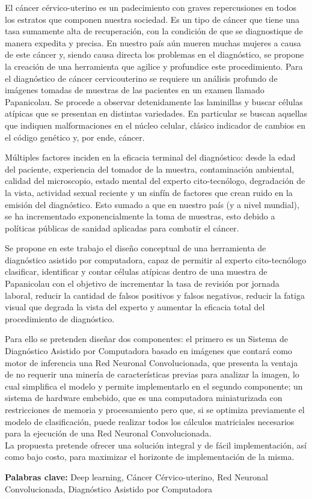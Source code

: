 El cáncer cérvico-uterino es un padecimiento con graves repercusiones en todos
los estratos que componen nuestra sociedad. Es un tipo de cáncer que tiene una tasa
sumamente alta de recuperación, con la condición de que se diagnostique de
manera expedita y precisa. En nuestro país aún mueren muchas mujeres a causa de
este cáncer y, siendo causa directa los problemas en el diagnóstico, se propone
la creación de una herramienta que agilice y profundice este procedimiento. Para
el diagnóstico de cáncer cervicouterino se requiere un análisis profundo de
imágenes tomadas de muestras de las pacientes en un examen llamado Papanicolau.
Se procede a observar detenidamente las laminillas y buscar células atípicas que
se presentan en distintas variedades. En particular se buscan aquellas que
indiquen malformaciones en el núcleo celular, clásico indicador de cambios en el
código genético y, por ende, cáncer. 

Múltiples factores inciden en la eficacia terminal del diagnóstico: desde la
edad del paciente, experiencia del tomador de la muestra, contaminación
ambiental, calidad del microscopio, estado mental del experto cito-tecnólogo,
degradación de la vista, actividad sexual reciente y un sinfín de factores que
crean ruido en la emisión del diagnóstico. Esto sumado a que en nuestro país (y a
nivel mundial), se ha incrementado exponencialmente la toma de muestras, esto
debido a políticas públicas de sanidad aplicadas para combatir el cáncer. 

Se propone en este trabajo el diseño conceptual de una herramienta de
diagnóstico asistido por computadora, capaz de permitir al experto
cito-tecnólogo clasificar, identificar y contar células atípicas dentro de una
muestra de Papanicolau con el objetivo de incrementar la tasa de revisión por
jornada laboral, reducir la cantidad de falsos positivos y falsos negativos,
reducir la fatiga visual que degrada la vista del experto y aumentar la eficacia
total del procedimiento de diagnóstico.

Para ello se pretenden diseñar dos componentes: el primero es un Sistema de
Diagnóstico Asistido por Computadora basado en imágenes que contará como motor
de inferencia una Red Neuronal Convolucionada, que presenta la ventaja de no
requerir una minería de características previas para analizar la imagen, lo cual
simplifica el modelo y permite implementarlo en el segundo componente; un
sistema de hardware embebido, que es una computadora miniaturizada con
restricciones de memoria y procesamiento pero que, si se optimiza previamente el
modelo de clasificación, puede realizar todos los cálculos matriciales necesarios
para la ejecución de una Red Neuronal Convolucionada. \\
La propuesta pretende ofrecer una solución integral y de fácil implementación,
así como bajo costo, para maximizar el horizonte de implementación de la misma.

\textbf{Palabras clave:} Deep learning, Cáncer Cérvico-uterino, Red Neuronal
Convolucionada, Diagnóstico Asistido por Computadora